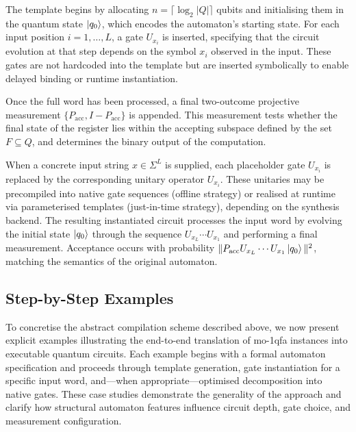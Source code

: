 The template begins by allocating $n = \lceil\log_2 |Q|\rceil$ qubits and initialising them in the quantum state $\ket{q_0}$, which encodes the automaton's starting state. For each input position $i = 1,\dots,L$, a gate $\boxed{U_{x_i}}$ is inserted, specifying that the circuit evolution at that step depends on the symbol $x_i$ observed in the input. These gates are not hardcoded into the template but are inserted symbolically to enable delayed binding or runtime instantiation.

Once the full word has been processed, a final two-outcome projective measurement $\{P_{\text{acc}}, I - P_{\text{acc}}\}$ is appended. This measurement tests whether the final state of the register lies within the accepting subspace defined by the set $F \subseteq Q$, and determines the binary output of the computation.

\medskip

When a concrete input string $x \in \Sigma^L$ is supplied, each placeholder gate $\boxed{U_{x_i}}$ is replaced by the corresponding unitary operator $U_{x_i}$. These unitaries may be precompiled into native gate sequences (offline strategy) or realised at runtime via parameterised templates (just-in-time strategy), depending on the synthesis backend. The resulting instantiated circuit processes the input word by evolving the initial state $\ket{q_0}$ through the sequence $U_{x_L} \cdots U_{x_1}$ and performing a final measurement. Acceptance occurs with probability $\|P_{\text{acc}} U_{x_L} \cdots U_{x_1} \ket{q_0}\|^2$, matching the semantics of the original automaton.


\subsection{Step-by-Step Examples}
To concretise the abstract compilation scheme described above, we now present explicit examples illustrating the end-to-end translation of \gls{mo-1qfa} instances into executable quantum circuits. Each example begins with a formal automaton specification and proceeds through template generation, gate instantiation for a specific input word, and—when appropriate—optimised decomposition into native gates. These case studies demonstrate the generality of the approach and clarify how structural automaton features influence circuit depth, gate choice, and measurement configuration.
